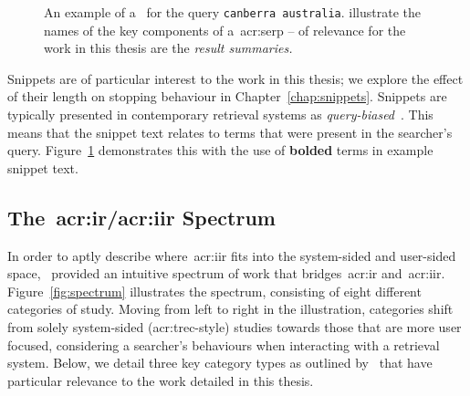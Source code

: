 \begin{figure}[t!]
    \centering
    \caption[Example of a~\gls{acr:serp}]{An example of a~ for the query \texttt{canberra australia}.  illustrate the names of the key components of a~\gls{acr:serp} – of relevance for the work in this thesis are the \emph{result summaries.}}
    \label{fig:serp_example}
\end{figure}

Snippets are of particular interest to the work in this thesis; we explore the effect of their length on stopping behaviour in Chapter~\ref{chap:snippets}. Snippets are typically presented in contemporary retrieval systems as \emph{query-biased}~\citep{tombros1998query_biased}. This means that the snippet text relates to terms that were present in the searcher's query. Figure~\ref{fig:serp_example} demonstrates this with the use of \textbf{bolded} terms in example snippet text.

\subsection{The~\gls{acr:ir}/\gls{acr:iir} Spectrum}\label{sec:ir_background:user:spectrum}
In order to aptly describe where~\gls{acr:iir} fits into the system-sided and user-sided space,~\cite{kelly2009iir} provided an intuitive spectrum of work that bridges~\gls{acr:ir} and~\gls{acr:iir}. Figure~\ref{fig:spectrum} illustrates the spectrum, consisting of eight different categories of study. Moving from left to right in the illustration, categories shift from solely system-sided (\gls{acr:trec}-style) studies towards those that are more user focused, considering a searcher's behaviours when interacting with a retrieval system. Below, we detail three key category types as outlined by~\cite{kelly2009iir} that have particular relevance to the work detailed in this thesis.

